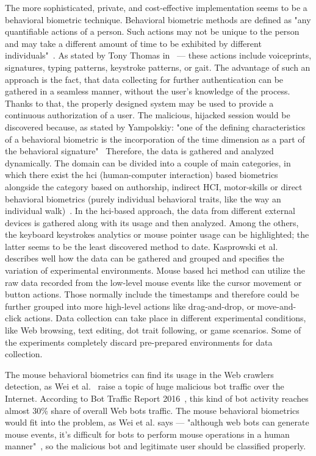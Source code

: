 The more sophisticated, private, and cost-effective implementation seems to be a behavioral biometric technique.
Behavioral biometric methods are defined as "any quantifiable actions of a person.
Such actions may not be unique to the person and may take a different amount of time to be exhibited by different individuals"~\cite{Yampolskiy2011}.
As stated by Tony Thomas in~\cite{thomas2020machine} --- these actions include voiceprints, signatures, typing patterns, keystroke patterns, or gait.
The advantage of such an approach is the fact, that data collecting for further authentication can be gathered in a seamless manner, without the user's knowledge of the process.
Thanks to that, the properly designed system may be used to provide a continuous authorization of a user.
The malicious, hijacked session would be discovered because, as stated by Yampolskiy: "one of the defining characteristics of a behavioral biometric is the incorporation of the time dimension as a part of the behavioral signature"~\cite{Yampolskiy2011}
Therefore, the data is gathered and analyzed dynamically.
The domain can be divided into a couple of main categories, in which there exist the \gls{hci} (human-computer interaction) based biometrics alongside the category based on authorship, indirect HCI, motor-skills or direct behavioral biometrics (purely individual behavioral traits, like the way an individual walk)~\cite{Yampolskiy2011}.
In the \gls{hci}-based approach, the data from different external devices is gathered along with its usage and then analyzed.
Among the others, the keyboard keystrokes analytics or mouse pointer usage can be highlighted; the latter seems to be the least discovered method to date.
Kasprowski et al.~\cite{kasprowski2018fusion} describes well how the data can be gathered and grouped and specifies the variation of experimental environments.
Mouse based \gls{hci} method can utilize the raw data recorded from the low-level mouse events like the cursor movement or button actions.
Those normally include the timestamps and therefore could be further grouped into more high-level actions like drag-and-drop, or move-and-click actions.
Data collection can take place in different experimental conditions, like Web browsing, text editing, dot trait following, or game scenarios.
Some of the experiments completely discard pre-prepared environments for data collection.

The mouse behavioral biometrics can find its usage in the Web crawlers detection, as Wei et al.~\cite{a-deep-learning-approach-to-web-bot-detection-using-mouse-behavioral-biometrics} raise a topic of huge malicious bot traffic over the Internet.
According to Bot Traffic Report 2016~\cite{bot-share-2016}, this kind of bot activity reaches almost 30\% share of overall Web bots traffic.
The mouse behavioral biometrics would fit into the problem, as Wei et al. says --- "although web bots can generate mouse events, it’s difficult for bots to perform mouse operations in a human manner"~\cite{a-deep-learning-approach-to-web-bot-detection-using-mouse-behavioral-biometrics}, so the malicious bot and legitimate user should be classified properly.